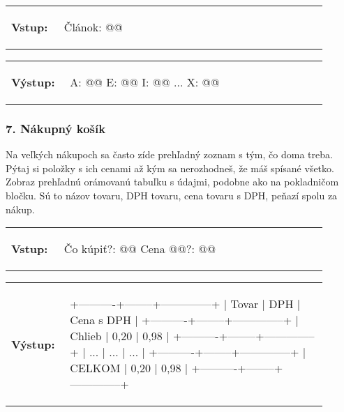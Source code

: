 \begin{tabular}{@{}p{0.15\linewidth}p{0.75\linewidth}}
\textbf{\small Vstup:} &
\vspace{-3em}
\begin{code}
Článok: @\fbox{\phantom{Dlhý text článku s veľa slovami}}@
\end{code}
\end{tabular}

\vspace{-2em}
\begin{tabular}{@{}p{0.15\linewidth}p{0.75\linewidth}}
\textbf{\small Výstup:} &
\vspace{-3em}
\begin{code}
A: @\fbox{****}@
E: @\fbox{*******}@
I: @\fbox{****}@
...
X: @\fbox{*}@
\end{code}
\end{tabular}
\vspace{-2em}


\subsubsection*{7. Nákupný košík}
Na veľkých nákupoch sa často zíde prehľadný zoznam s tým, čo doma treba. Pýtaj si položky s ich cenami až kým sa nerozhodneš, že máš spísané všetko. Zobraz prehľadnú orámovanú tabuľku s údajmi, podobne ako na pokladničom bločku. Sú to názov tovaru, DPH tovaru, cena tovaru s DPH, peňazí spolu za nákup.

\begin{tabular}{@{}p{0.15\linewidth}p{0.75\linewidth}}
\textbf{\small Vstup:} &
\vspace{-3em}
\begin{code}
Čo kúpiť?: @\fbox{\phantom{vstup}}@
Cena @\fbox{\phantom{vstup}}@?: @\fbox{\phantom{vstup}}@
\end{code}
\end{tabular}

\vspace{-2em}
\begin{tabular}{@{}p{0.15\linewidth}p{0.75\linewidth}}
\textbf{\small Výstup:} &
\vspace{-3em}
\begin{code}
+----------+--------+--------------+
| Tovar    |  DPH   |  Cena s DPH  |
+----------+--------+--------------+
| Chlieb   |  0,20  |      0,98    |
+----------+--------+--------------+
|    ...   |  ...   |     ...      |
+----------+--------+--------------+
| CELKOM   |  0,20  |      0,98    |
+----------+--------+--------------+
\end{code}
\end{tabular}
\vspace{-2em}

